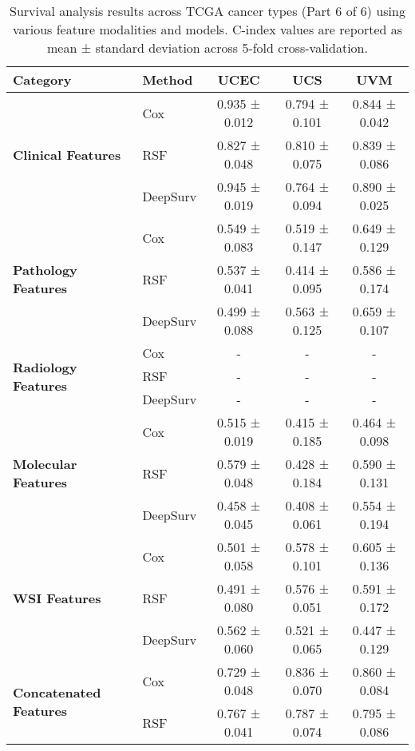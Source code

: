 \begin{sidewaystable}[htbp]
    \centering
    \caption{Survival analysis results across TCGA cancer types (Part 6 of 6) using various feature modalities and models. C-index values are reported as mean ± standard deviation across 5-fold cross-validation.}
    \label{tab:survival_results_6}
    \begin{tabular}{@{}llccc@{}}
        \toprule
        \textbf{Category} & \textbf{Method} & \textbf{UCEC} & \textbf{UCS} & \textbf{UVM} \\
        \midrule
        \multirow{3}{*}{\textbf{Clinical Features}} & Cox & 0.935 ± 0.012 & 0.794 ± 0.101 & 0.844 ± 0.042 \\
        & RSF & 0.827 ± 0.048 & 0.810 ± 0.075 & 0.839 ± 0.086 \\
        & DeepSurv & 0.945 ± 0.019 & 0.764 ± 0.094 & 0.890 ± 0.025 \\
        \midrule
        \multirow{3}{*}{\textbf{Pathology Features}} & Cox & 0.549 ± 0.083 & 0.519 ± 0.147 & 0.649 ± 0.129 \\
        & RSF & 0.537 ± 0.041 & 0.414 ± 0.095 & 0.586 ± 0.174 \\
        & DeepSurv & 0.499 ± 0.088 & 0.563 ± 0.125 & 0.659 ± 0.107 \\
        \midrule
        \multirow{3}{*}{\textbf{Radiology Features}} & Cox & - & - & - \\
        & RSF & - & - & - \\
        & DeepSurv & - & - & - \\
        \midrule
        \multirow{3}{*}{\textbf{Molecular Features}} & Cox & 0.515 ± 0.019 & 0.415 ± 0.185 & 0.464 ± 0.098 \\
        & RSF & 0.579 ± 0.048 & 0.428 ± 0.184 & 0.590 ± 0.131 \\
        & DeepSurv & 0.458 ± 0.045 & 0.408 ± 0.061 & 0.554 ± 0.194 \\
        \midrule
        \multirow{3}{*}{\textbf{WSI Features}} & Cox & 0.501 ± 0.058 & 0.578 ± 0.101 & 0.605 ± 0.136 \\
        & RSF & 0.491 ± 0.080 & 0.576 ± 0.051 & 0.591 ± 0.172 \\
        & DeepSurv & 0.562 ± 0.060 & 0.521 ± 0.065 & 0.447 ± 0.129 \\
        \midrule
        \multirow{3}{*}{\textbf{Concatenated Features}} & Cox & 0.729 ± 0.048 & 0.836 ± 0.070 & 0.860 ± 0.084 \\
        & RSF & 0.767 ± 0.041 & 0.787 ± 0.074 & 0.795 ± 0.086 \\

\end{tabular}
\end{sidewaystable}

